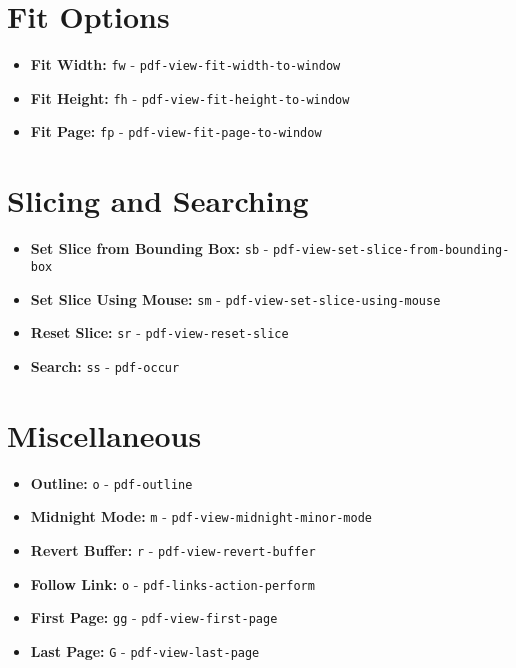 \documentclass[a4paper,10pt]{article}
\begin{document}
\section*{Fit Options}
\begin{itemize}
    \item \textbf{Fit Width:} \texttt{fw} - \texttt{pdf-view-fit-width-to-window}
    \item \textbf{Fit Height:} \texttt{fh} - \texttt{pdf-view-fit-height-to-window}
    \item \textbf{Fit Page:} \texttt{fp} - \texttt{pdf-view-fit-page-to-window}
\end{itemize}

\section*{Slicing and Searching}
\begin{itemize}
    \item \textbf{Set Slice from Bounding Box:} \texttt{sb} - \texttt{pdf-view-set-slice-from-bounding-box}
    \item \textbf{Set Slice Using Mouse:} \texttt{sm} - \texttt{pdf-view-set-slice-using-mouse}
    \item \textbf{Reset Slice:} \texttt{sr} - \texttt{pdf-view-reset-slice}
    \item \textbf{Search:} \texttt{ss} - \texttt{pdf-occur}
\end{itemize}

\section*{Miscellaneous}
\begin{itemize}
    \item \textbf{Outline:} \texttt{o} - \texttt{pdf-outline}
    \item \textbf{Midnight Mode:} \texttt{m} - \texttt{pdf-view-midnight-minor-mode}
    \item \textbf{Revert Buffer:} \texttt{r} - \texttt{pdf-view-revert-buffer}
    \item \textbf{Follow Link:} \texttt{o} - \texttt{pdf-links-action-perform}
    \item \textbf{First Page:} \texttt{gg} - \texttt{pdf-view-first-page}
    \item \textbf{Last Page:} \texttt{G} - \texttt{pdf-view-last-page}
\end{itemize}
\end{document}

